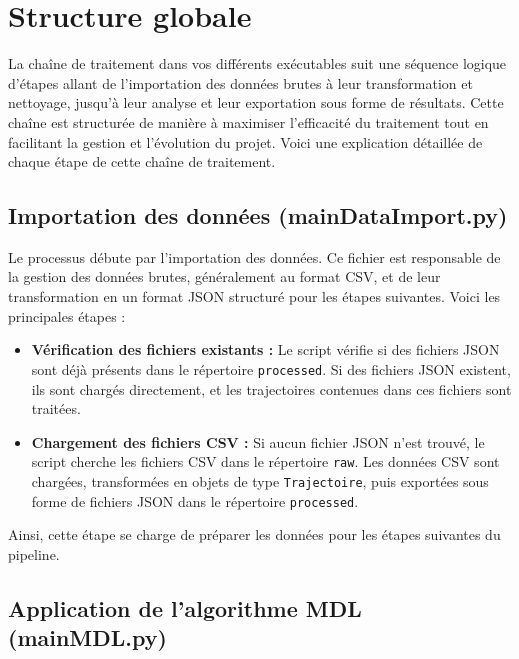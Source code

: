 \documentclass{article}
\begin{document}
    \section{Structure globale}

        La chaîne de traitement dans vos différents exécutables suit une séquence logique d'étapes allant de l'importation des données brutes à leur transformation et nettoyage, jusqu'à leur analyse et leur exportation sous forme de résultats. Cette chaîne est structurée de manière à maximiser l'efficacité du traitement tout en facilitant la gestion et l'évolution du projet. Voici une explication détaillée de chaque étape de cette chaîne de traitement.
        
        \subsection{Importation des données (mainDataImport.py)}
        
        Le processus débute par l'importation des données. Ce fichier est responsable de la gestion des données brutes, généralement au format CSV, et de leur transformation en un format JSON structuré pour les étapes suivantes. Voici les principales étapes :
        
        \begin{itemize}
            \item \textbf{Vérification des fichiers existants :} Le script vérifie si des fichiers JSON sont déjà présents dans le répertoire \texttt{processed}. Si des fichiers JSON existent, ils sont chargés directement, et les trajectoires contenues dans ces fichiers sont traitées.
            \item \textbf{Chargement des fichiers CSV :} Si aucun fichier JSON n'est trouvé, le script cherche les fichiers CSV dans le répertoire \texttt{raw}. Les données CSV sont chargées, transformées en objets de type \texttt{Trajectoire}, puis exportées sous forme de fichiers JSON dans le répertoire \texttt{processed}.
        \end{itemize}
        
        Ainsi, cette étape se charge de préparer les données pour les étapes suivantes du pipeline.
        
        \subsection{Application de l'algorithme MDL (mainMDL.py)}
        
\end{document}
